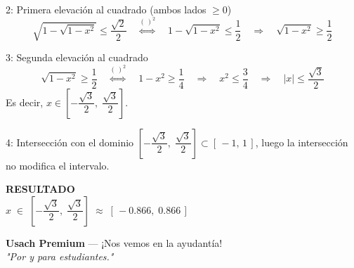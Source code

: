 \documentclass[letterpaper, 11pt]{article}
\newcommand{\resultado}[1]{%
    \begin{tcolorbox}[colback=azulFuerte, colframe=azulFuerte, colupper=white,
        arc=8pt, boxrule=1.5pt, enhanced, drop shadow={black!12}]
        \centering\large\textbf{RESULTADO} \\[0.4em]
        \LARGE $\displaystyle #1$
    \end{tcolorbox}}
\begin{document}
\begin{paso}{2: Primera elevación al cuadrado (ambos lados $\geq 0$)}
\[
    \sqrt{1-\sqrt{1-x^2}} \leq \frac{\sqrt{2}}{2}
    \quad\stackrel{(\,)^2}{\Longleftrightarrow}\quad
    1 - \sqrt{1-x^2} \leq \frac{1}{2}
    \quad\Longrightarrow\quad
    \sqrt{1-x^2} \geq \frac{1}{2}
\]
\end{paso}

\begin{paso}{3: Segunda elevación al cuadrado}
\[
    \sqrt{1-x^2} \geq \frac{1}{2}
    \quad\stackrel{(\,)^2}{\Longleftrightarrow}\quad
    1 - x^2 \geq \frac{1}{4}
    \quad\Longrightarrow\quad
    x^2 \leq \frac{3}{4}
    \quad\Longrightarrow\quad
    |x| \leq \frac{\sqrt{3}}{2}
\]
Es decir, $x \in \left[-\dfrac{\sqrt{3}}{2},\;\dfrac{\sqrt{3}}{2}\right]$.
\end{paso}

\begin{paso}{4: Intersección con el dominio}
$\left[-\dfrac{\sqrt{3}}{2},\;\dfrac{\sqrt{3}}{2}\right] \subset [\,-1,\,1\,]$, luego la intersección no modifica el intervalo.
\end{paso}

\resultado{x \;\in\; \left[-\dfrac{\sqrt{3}}{2},\;\dfrac{\sqrt{3}}{2}\right] \;\approx\; [\,-0.866,\;0.866\,]}

\vspace{1.2cm}
\begin{center}
    \small\textbf{Usach Premium} --- ¡Nos vemos en la ayudantía! \\
    \textit{"Por y para estudiantes."}
\end{center}
\end{document}
